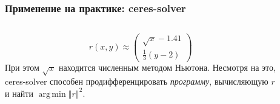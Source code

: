 \documentclass[notheorems,aspectratio=169]{beamer}
\DeclareMathOperator*{\argmin}{arg\,min}
\begin{document}
\begin{frame}
  \frametitle{Применение на практике: ceres-solver}
  \begin{columns}
    \begin{column}{0.4\textwidth}
      \begin{equation*}
        r\left(x, y\right)\approx
        \begin{pmatrix}
          \sqrt{x}-1.41 \\
          \frac{1}{3}\left(y-2\right)
        \end{pmatrix}
      \end{equation*}
      При этом $\sqrt{x}$ находится численным методом Ньютона. Несмотря на это, ceres-solver способен продифференцировать \emph{программу}, вычисляющую $r$ и найти $\argmin\left\Vert r\right\Vert^2$.
    \end{column}

    \begin{column}{0.6\textwidth}
      \begin{figure}
      \end{figure}
    \end{column}
  \end{columns}
\end{frame}
\end{document}
